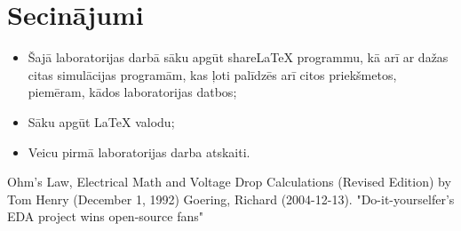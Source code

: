 \documentclass{report}
\begin{document}
\chapter{Secinājumi}
\begin{itemize}
\item Šajā laboratorijas darbā sāku apgūt shareLaTeX programmu, kā arī ar dažas citas simulācijas programām, kas ļoti palīdzēs arī citos priekšmetos, piemēram, kādos laboratorijas datbos;
\item Sāku apgūt LaTeX valodu;
\item Veicu pirmā laboratorijas darba atskaiti.
\end{itemize}

\begin{thebibliography}{1}
Ohm's Law, Electrical Math and Voltage Drop Calculations (Revised Edition) by Tom Henry (December 1, 1992)
 Goering, Richard (2004-12-13). "Do-it-yourselfer's EDA project wins open-source fans"
\end{thebibliography}
\end{document}
